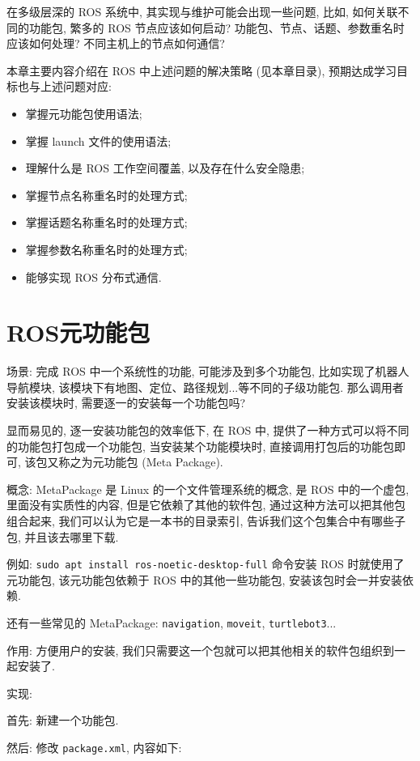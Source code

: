 \documentclass[openany, fontset=windowsold]{ctexbook}
\theoremstyle{kaiti}
\theoremstyle{normal}
\begin{document}
在多级层深的 ROS 系统中, 其实现与维护可能会出现一些问题, 比如, 如何关联不同的功能包, 繁多的 ROS 节点应该如何启动? 功能包、节点、话题、参数重名时应该如何处理? 不同主机上的节点如何通信? 

本章主要内容介绍在 ROS 中上述问题的解决策略 (见本章目录), 预期达成学习目标也与上述问题对应: 

\begin{itemize}
  \item 掌握元功能包使用语法; 
  \item 掌握 launch 文件的使用语法; 
  \item 理解什么是 ROS 工作空间覆盖, 以及存在什么安全隐患; 
  \item 掌握节点名称重名时的处理方式; 
  \item 掌握话题名称重名时的处理方式; 
  \item 掌握参数名称重名时的处理方式; 
  \item 能够实现 ROS 分布式通信.
\end{itemize}

\section{ROS元功能包}

场景: 完成 ROS 中一个系统性的功能, 可能涉及到多个功能包, 比如实现了机器人导航模块, 该模块下有地图、定位、路径规划...等不同的子级功能包. 那么调用者安装该模块时, 需要逐一的安装每一个功能包吗?

显而易见的, 逐一安装功能包的效率低下, 在 ROS 中, 提供了一种方式可以将不同的功能包打包成一个功能包, 当安装某个功能模块时, 直接调用打包后的功能包即可, 该包又称之为元功能包 (Meta Package).

概念: MetaPackage 是 Linux 的一个文件管理系统的概念, 是 ROS 中的一个虚包, 里面没有实质性的内容, 但是它依赖了其他的软件包, 通过这种方法可以把其他包组合起来, 我们可以认为它是一本书的目录索引, 告诉我们这个包集合中有哪些子包, 并且该去哪里下载.

例如: \verb|sudo apt install ros-noetic-desktop-full| 命令安装 ROS 时就使用了元功能包, 该元功能包依赖于 ROS 中的其他一些功能包, 安装该包时会一并安装依赖.

还有一些常见的 MetaPackage: \verb|navigation|, \verb|moveit|, \verb|turtlebot3|...

作用: 方便用户的安装, 我们只需要这一个包就可以把其他相关的软件包组织到一起安装了.

实现:

首先: 新建一个功能包.

然后: 修改 \verb|package.xml|, 内容如下:
\end{document}
